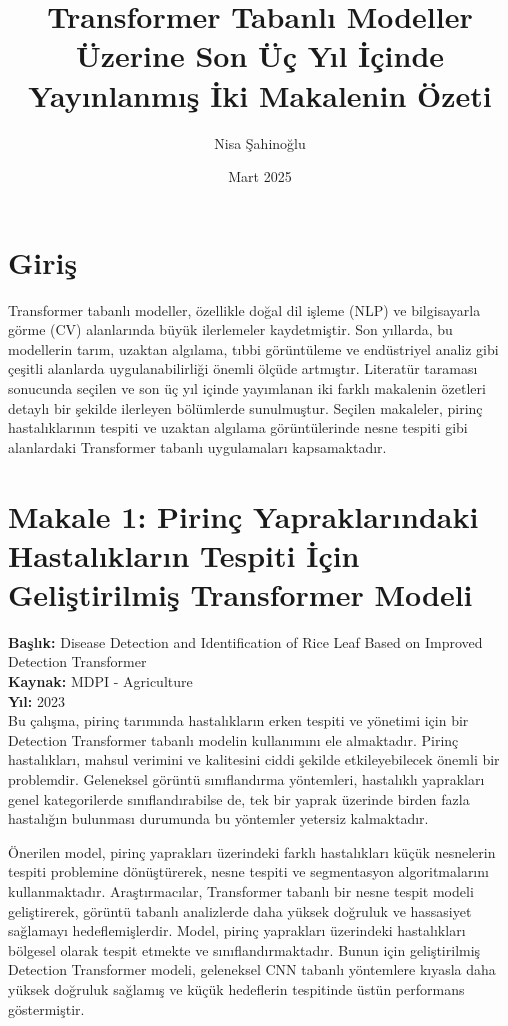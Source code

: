 \documentclass[a4paper,12pt]{article}
\title{Transformer Tabanlı Modeller Üzerine Son Üç Yıl İçinde Yayınlanmış İki Makalenin Özeti}
\author{Nisa Şahinoğlu}
\date{Mart 2025}
\begin{document}
\maketitle

\section{Giriş}
Transformer tabanlı modeller, özellikle doğal dil işleme (NLP) ve bilgisayarla görme (CV) alanlarında büyük ilerlemeler kaydetmiştir. Son yıllarda, bu modellerin tarım, uzaktan algılama, tıbbi görüntüleme ve endüstriyel analiz gibi çeşitli alanlarda uygulanabilirliği önemli ölçüde artmıştır. Literatür taraması sonucunda seçilen ve son üç yıl içinde yayımlanan iki farklı makalenin özetleri detaylı bir şekilde ilerleyen bölümlerde sunulmuştur. Seçilen makaleler, pirinç hastalıklarının tespiti ve uzaktan algılama görüntülerinde nesne tespiti gibi alanlardaki Transformer tabanlı uygulamaları kapsamaktadır.

\section{Makale 1: Pirinç Yapraklarındaki Hastalıkların Tespiti İçin Geliştirilmiş Transformer Modeli}
\textbf{Başlık:} Disease Detection and Identification of Rice Leaf Based on Improved Detection Transformer\\
\textbf{Kaynak:} MDPI - Agriculture\\
\textbf{Yıl:} 2023\\

Bu çalışma, pirinç tarımında hastalıkların erken tespiti ve yönetimi için bir Detection Transformer tabanlı modelin kullanımını ele almaktadır. Pirinç hastalıkları, mahsul verimini ve kalitesini ciddi şekilde etkileyebilecek önemli bir problemdir. Geleneksel görüntü sınıflandırma yöntemleri, hastalıklı yaprakları genel kategorilerde sınıflandırabilse de, tek bir yaprak üzerinde birden fazla hastalığın bulunması durumunda bu yöntemler yetersiz kalmaktadır.

Önerilen model, pirinç yaprakları üzerindeki farklı hastalıkları küçük nesnelerin tespiti problemine dönüştürerek, nesne tespiti ve segmentasyon algoritmalarını kullanmaktadır. Araştırmacılar, Transformer tabanlı bir nesne tespit modeli geliştirerek, görüntü tabanlı analizlerde daha yüksek doğruluk ve hassasiyet sağlamayı hedeflemişlerdir. Model, pirinç yaprakları üzerindeki hastalıkları bölgesel olarak tespit etmekte ve sınıflandırmaktadır. Bunun için geliştirilmiş Detection Transformer modeli, geleneksel CNN tabanlı yöntemlere kıyasla daha yüksek doğruluk sağlamış ve küçük hedeflerin tespitinde üstün performans göstermiştir.
\end{document}
